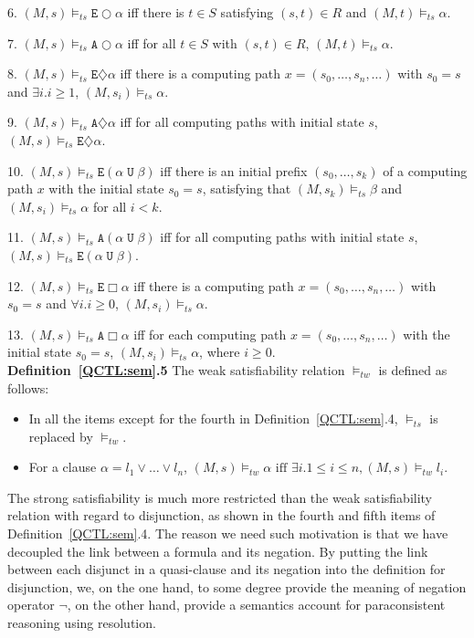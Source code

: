 \documentclass{entcs}
\begin{document}
6. $(M,s)\models_{ts}\texttt{E}\bigcirc \alpha$ iff there is
 $t\in S$ satisfying $(s,t)\in R$ and $(M,t)\models_{ts} \alpha$.


 7. $(M,s)\models_{ts}\texttt{A}\bigcirc \alpha$ iff  for all $t\in
 S$ with $(s,t)\in R$, $(M,t)\models_{ts} \alpha$.


8. $(M,s)\models_{ts}\texttt{E}\diamondsuit\alpha$ iff there
 is a computing path $x=(s_0, \ldots, s_n, \ldots)$ with $s_0=s$ and
$\exists i.i\geq 1$, $(M,s_i)\models_{ts}\alpha$.%


9. $(M,s)\models_{ts} \texttt{A}\diamondsuit\alpha$ iff for all
computing paths with initial state $s$, $(M,s)\models_{ts}
\texttt{E}\diamondsuit\alpha $.

10. $(M,s)\models_{ts} \texttt{E}(\alpha\;\texttt{U}\;\beta)$ iff
there is an initial prefix $(s_0, \ldots, s_k)$ of a computing
path $x$
 with the initial state $s_0=s$, satisfying that $(M,s_k)\models_{ts} \beta$ and
$(M,s_i)\models_{ts} \alpha$ for all $i<k$.

11. $(M,s)\models_{ts}\texttt{A}(\alpha\;\texttt{U}\; \beta)$ iff
for all computing paths with initial state $s$,
$(M,s)\models_{ts}\texttt{E}(\alpha\;\texttt{U}\;\beta)$. %

12. $(M,s)\models_{ts}\texttt{E}\Box \alpha$ iff there is a
computing path $x=(s_0, \ldots, s_n,\ldots)$ with $s_0=s$ and
$\forall i.i\geq 0$, $(M,s_i)\models_{ts}\alpha$.

13. $(M,s)\models_{ts}\texttt{A}\Box \alpha$ iff for each
computing path $x=(s_0, \ldots, s_n, \ldots)$ with the initial
state $s_0=s$, $(M,s_i)\models_{ts}\alpha$, where $i\geq 0$.\\


\noindent\textbf{Definition~\ref{QCTL:sem}.5}  The weak
satisfiability relation $\models_{tw}$ is defined as follows:
\begin{itemize}
\item In all the items except for the fourth  in
Definition~\ref{QCTL:sem}.4,
 $\models_{ts}$ is replaced by $\models_{tw}$.
\item For a clause $\alpha=l_1\vee\ldots\vee l_n$,
$(M,s)\models_{tw} \alpha \mbox{ iff } \exists i.1\le i\le n,
 (M,s)\models_{tw}l_i$.
\end{itemize}

The strong satisfiability is much more restricted than the weak
satisfiability relation with regard to disjunction, as shown in
the fourth and fifth items of Definition~\ref{QCTL:sem}.4. The
reason we need such motivation is that we have decoupled the link
between a formula and its negation. By putting the link between
each disjunct in a quasi-clause and its negation into the
definition for disjunction, we, on the one hand, to some degree
provide the meaning of negation operator $\neg$, on the other
hand, provide a semantics account for paraconsistent reasoning
using resolution.
\end{document}
